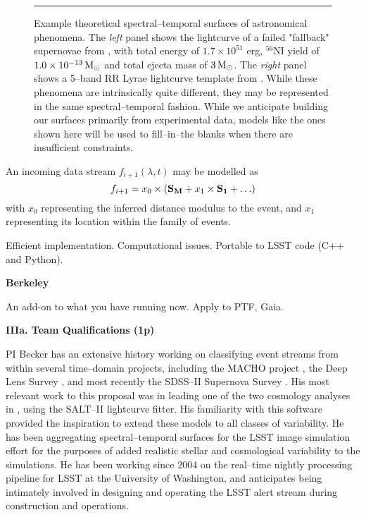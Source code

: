\begin{figure}[t]
\centerline{ \hfil
{}} \smallskip
\caption[]{\footnotesize Example theoretical spectral--temporal surfaces of
astronomical phenomena.  The {\it left} panel shows the lightcurve of a failed
"fallback" supernovae from \cite{2009ApJ...707..193F}, with total energy of $1.7
\times 10^{51}$ erg, $^{56}$NI yield of $1.0 \times 10^{-13} {\rm\,M_\odot}$ and total
ejecta mass of $3 {\rm\,M_\odot}$.  The {\it right} panel shows a 5--band RR Lyrae
lightcurve template from \cite{2010ApJ...708..717S}.  While these phenomena are
intrinsically quite different, they may be represented in the same
spectral--temporal fashion.  While we anticipate building our surfaces primarily
from experimental data, models like the ones shown here will be used to
fill--in--the blanks when there are insufficient constraints.} \medskip \hrule
\label{fig:sts} \end{figure}


 

An incoming data stream $f_{i+1}(\lambda, t)$ may be modelled as $$f_{i+1} = x_0
\times ({\bf S_M} + x_1 \times {\bf S_1} + \ldots)$$ with $x_0$ representing the
inferred distance modulus to the event, and $x_1$ representing its location
within the family of events.

Efficient implementation.  Computational issues.  Portable to LSST code (C++ and
Python).

 \smallskip
{\bf Berkeley}

An add-on to what you have running now.  Apply to PTF, Gaia.



\bigskip \centerline{\bf IIIa. Team Qualifications (1p)} \smallskip

 \smallskip

PI Becker has an extensive history working on classifying event streams from
within several time--domain projects, including the MACHO project
\citep{2000PhDT.......258B}, the Deep Lens Survey \citep{2004ApJ...611..418B},
and most recently the SDSS--II Supernova Survey
\citep{2008AJ....135..338F,2008AJ....135..348S}.  His most relevant work to this
proposal was in leading one of the two cosmology analyses in
\cite{2009ApJS..185...32K}, using the SALT--II lightcurve fitter.  His
familiarity with this software provided the inspiration to extend these models
to all classes of variability. He has been aggregating spectral--temporal
surfaces for the LSST image simulation effort \citep{2010SPIE.7738E..53C} for
the purposes of added realistic stellar and cosmological variability to the
simulations.  He has been working since 2004 on the real--time nightly
processing pipeline for LSST at the University of Washington, and anticipates
being intimately involved in designing and operating the LSST alert stream
during construction and operations.


